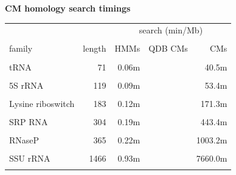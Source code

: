 \documentclass[landscape]{slides}
\begin{document}
\begin{slide}
\begin{center}
\textbf{CM homology search timings}
\end{center}

\small
\begin{center}
\small
\begin{tabular}{lr|rrr}
                  &        & \multicolumn{3}{c|}{search (min/Mb)} \\
                  &        &        &        &         \\
family            & length & HMMs   & QDB CMs&    CMs  \\
                  &        &        &        &         \\
tRNA              & 71     &  0.06m &        &   40.5m \\
                  &        &        &        &         \\
5S rRNA           & 119    &  0.09m &        &   53.4m \\
                  &        &        &        &         \\
Lysine riboswitch & 183    &  0.12m &        & 171.3m \\
                  &        &        &        &         \\
SRP RNA           & 304    &  0.19m &        & 443.4m \\
                  &        &        &        &         \\
RNaseP            & 365    &  0.22m &        &1003.2m  \\
                  &        &        &        &         \\
SSU rRNA          & 1466   &  0.93m &        &7660.0m  \\
                  &        &        &        &         \\
\end{tabular}
\end{center}

\vfill

\end{slide}
\end{document}
